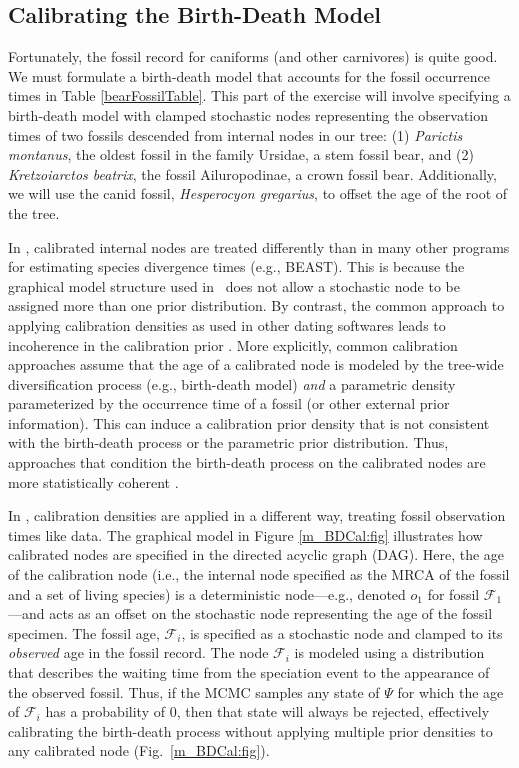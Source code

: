 \bigskip
\subsection{Calibrating the Birth-Death Model}\label{brMods} 

Fortunately, the fossil record for caniforms (and other carnivores) is quite good. 
We must formulate a birth-death model that accounts for the fossil occurrence times in Table \ref{bearFossilTable}. 
This part of the exercise will involve specifying a birth-death model with clamped stochastic nodes representing the observation times of two fossils descended from internal nodes in our tree: (1) \textit{Parictis montanus}, the oldest fossil in the family Ursidae, a stem fossil bear, and (2) \textit{Kretzoiarctos beatrix}, the fossil Ailuropodinae, a crown fossil bear.
Additionally, we will use the canid fossil, \textit{Hesperocyon gregarius}, to offset the age of the root of the tree. 

In \RevBayes, calibrated internal nodes are treated differently than in many other programs for estimating species divergence times (e.g., BEAST).
This is because the graphical model structure used in \RevBayes~does not allow a stochastic node to be assigned more than one prior distribution. 
By contrast, the common approach to applying calibration densities as used in other dating softwares leads to incoherence in the calibration prior \citep[for detailed explainations of this see][]{warnock12,heled12,heath2013fossilized}. 
More explicitly, common calibration approaches assume that the age of a calibrated node is modeled by the tree-wide diversification process (e.g., birth-death model) \textit{and} a parametric density parameterized by the occurrence time of a fossil (or other external prior information).
This can induce a calibration prior density that is not consistent with the birth-death process or the parametric prior distribution. 
Thus, approaches that condition the birth-death process on the calibrated nodes are more statistically coherent \citep{yang06}.

In \RevBayes, calibration densities are applied in a different way, treating fossil observation times like data. 
The graphical model in Figure \ref{m_BDCal:fig} illustrates how calibrated nodes are specified in the directed acyclic graph (DAG).
Here, the age of the calibration node (i.e., the internal node specified as the MRCA of the fossil and a set of living species) is a deterministic node---e.g., denoted $o_1$ for fossil $\mathcal{F}_1$---and acts as an offset on the stochastic node representing the age of the fossil specimen.
The fossil age, $\mathcal{F}_i$, is specified as a stochastic node and clamped to its \textit{observed} age in the fossil record. 
The node $\mathcal{F}_i$ is modeled using a distribution that describes the waiting time from the speciation event to the appearance of the observed fossil. 
Thus, if the MCMC samples any state of $\Psi$ for which the age of $\mathcal{F}_i$ has a probability of 0, then that state will always be rejected, effectively calibrating the birth-death process without applying multiple prior densities to any calibrated node (Fig.~\ref{m_BDCal:fig}).

